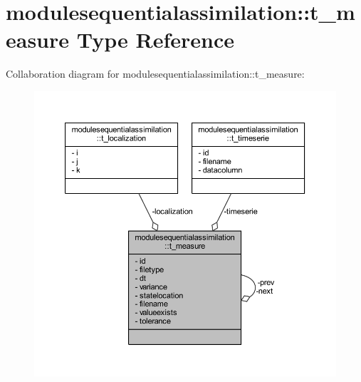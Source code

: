 \hypertarget{structmodulesequentialassimilation_1_1t__measure}{}\section{modulesequentialassimilation\+:\+:t\+\_\+measure Type Reference}
\label{structmodulesequentialassimilation_1_1t__measure}


Collaboration diagram for modulesequentialassimilation\+:\+:t\+\_\+measure\+:\nopagebreak
\begin{figure}[H]
\begin{center}
\leavevmode
\includegraphics[width=350pt]{structmodulesequentialassimilation_1_1t__measure__coll__graph}
\end{center}
\end{figure}
